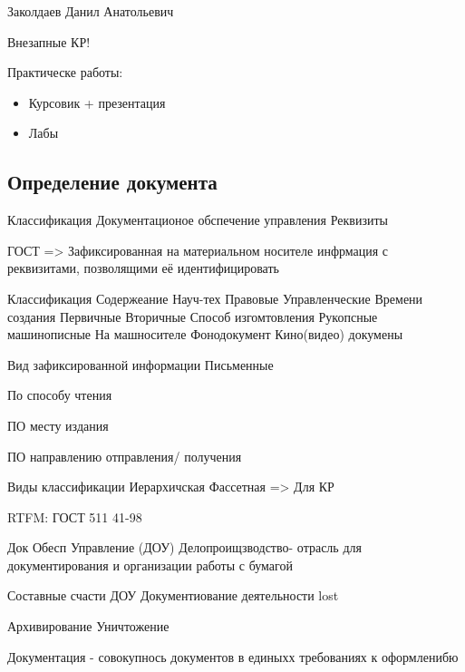 \documentclass[a4paper,12pt]{report}
\begin{document}
	\def \nocredits {}
	\def \LineE {Конспект по дисциплине}
	\def \LineF {Защита и обработка конфиденциальных данных}

	\maketitle




	Заколдаев Данил Анатольевич

	Внезапные КР!

	Практическе работы:
	\begin{itemize}
	\item	Курсовик + презентация
	\item	Лабы
	\end{itemize}

\subsection{Определение документа}

	Классификация
	Документационое обспечение управления
	Реквизиты

	 ГОСТ => Зафиксированная на материальном носителе инфрмация с реквизитами, позволящими её идентифицировать

	Классификация
		Содержеание
			Науч-тех
			Правовые
			Управленческие
		Времени создания
			Первичные
			Вторичные
		Способ изгомтовления
			Рукопсные
			машинописные
			На машносителе
			Фонодокумент
			Кино(видео) докумены

		Вид зафиксированной информации
			Письменные

		По способу чтения

		ПО месту издания

		ПО направлению отправления/ получения


		Виды классификации
			Иерархичская
			Фассетная => Для КР

		RTFM: ГОСТ 511 41-98

		Док Обесп Управление (ДОУ) Делопроищзводство- отрасль для документирования и организации работы с бумагой

		Составные счасти ДОУ
			Документиование деятельности
			lost

			Архивирование
			Уничтожение

			Документация - совокупнось документов в единыхх требованиях к оформленибю
\end{document}

